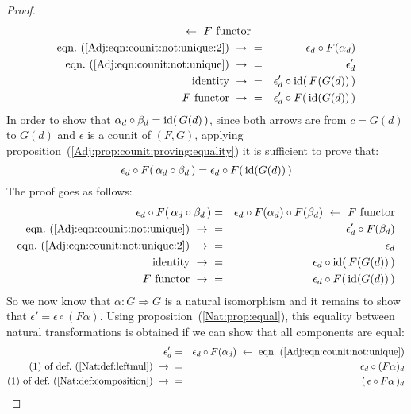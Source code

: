 \begin{proof}
\begin{eqnarray*}
            \ \leftarrow\ \mbox{$F$ functor}\\
            \mbox{eqn.~(\ref{Adj:eqn:counit:not:unique:2})}\ \to\ 
            &=&\epsilon_{d}\circ F(\alpha_{d})\\
            \mbox{eqn.~(\ref{Adj:eqn:counit:not:unique})}\ \to\ 
            &=&\epsilon_{d}'\\
            \mbox{identity}\ \to\ 
            &=&\epsilon_{d}'\circ \id(\,F(G(d))\,)\\
            \mbox{$F$ functor}\ \to\ 
            &=&\epsilon_{d}'\circ F(\,\id(G(d))\,)\\
        \end{eqnarray*}
    In order to show that $\alpha_{d}\circ\beta_{d}=\mbox{\rm id}(\,G(d)\,)$, since both 
    arrows are from $c=G(d)$ to $G(d)$ and $\epsilon$ is a counit of 
    $(F,G)$, applying proposition~(\ref{Adj:prop:counit:proving:equality}) it is 
    sufficient to prove that:
        \[
            \epsilon_{d}\circ F(\,\alpha_{d}\circ\beta_{d}\,)
            = 
            \epsilon_{d}\circ F(\,\mbox{\rm id}(G(d))\,)
        \]
    The proof goes as follows:
        \begin{eqnarray*}\epsilon_{d}\circ F(\,\alpha_{d}\circ\beta_{d}\,)
            &=&\epsilon_{d}\circ F(\alpha_{d})\circ F(\beta_{d})
            \ \leftarrow\ \mbox{$F$ functor}\\
            \mbox{eqn.~(\ref{Adj:eqn:counit:not:unique})}\ \to\ 
            &=&\epsilon_{d}'\circ F(\beta_{d})\\
            \mbox{eqn.~(\ref{Adj:eqn:counit:not:unique:2})}\ \to\ 
            &=&\epsilon_{d}\\
            \mbox{identity}\ \to\ 
            &=&\epsilon_{d}\circ \id(\,F(G(d))\,)\\
            \mbox{$F$ functor}\ \to\ 
            &=&\epsilon_{d}\circ F(\,\id(G(d))\,)\\
        \end{eqnarray*}
    So we now know that $\alpha:G\Rightarrow G$ is a natural isomorphism and it 
    remains to show that $\epsilon'=\epsilon\circ (F\alpha)$. Using 
    proposition~(\ref{Nat:prop:equal}), this equality between natural
    transformations is obtained if we can show that all components are equal:
        \begin{eqnarray*}\epsilon'_{d}
            &=&\epsilon_{d}\circ F(\alpha_{d})
            \ \leftarrow\ \mbox{eqn.~(\ref{Adj:eqn:counit:not:unique})}\\
            \mbox{$(1)$ of def.~(\ref{Nat:def:leftmul})}\ \to\ 
            &=&\epsilon_{d}\circ (F\alpha)_{d}\\
            \mbox{$(1)$ of def.~(\ref{Nat:def:composition})}\ \to\ 
            &=&(\,\epsilon\circ F\alpha\,)_{d}\\
        \end{eqnarray*}
\end{proof}
